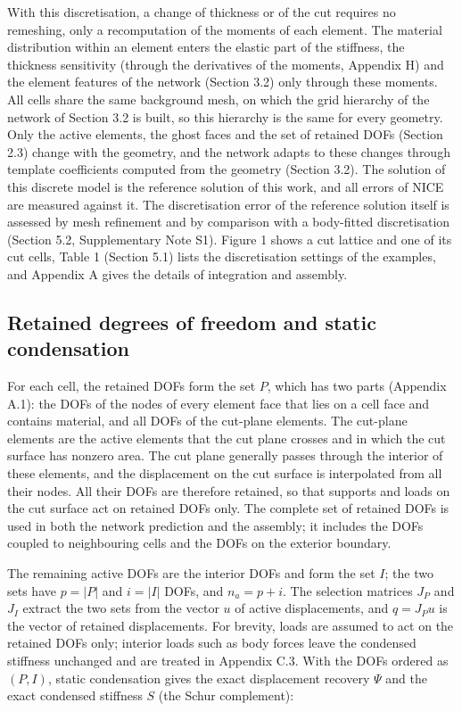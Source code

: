 \documentclass[preprint,12pt,authoryear]{elsarticle}
\begin{document}
With this discretisation, a change of thickness or of the cut requires no remeshing, only a recomputation of the moments of each element. The material distribution within an element enters the elastic part of the stiffness, the thickness sensitivity (through the derivatives of the moments, Appendix H) and the element features of the network (Section 3.2) only through these moments. All cells share the same background mesh, on which the grid hierarchy of the network of Section 3.2 is built, so this hierarchy is the same for every geometry. Only the active elements, the ghost faces and the set of retained DOFs (Section 2.3) change with the geometry, and the network adapts to these changes through template coefficients computed from the geometry (Section 3.2). The solution of this discrete model is the reference solution of this work, and all errors of NICE are measured against it. The discretisation error of the reference solution itself is assessed by mesh refinement and by comparison with a body-fitted discretisation (Section 5.2, Supplementary Note S1). Figure 1 shows a cut lattice and one of its cut cells, Table 1 (Section 5.1) lists the discretisation settings of the examples, and Appendix A gives the details of integration and assembly.

\subsection{Retained degrees of freedom and static condensation}

For each cell, the retained DOFs form the set \(P\), which has two parts (Appendix A.1): the DOFs of the nodes of every element face that lies on a cell face and contains material, and all DOFs of the cut-plane elements. The cut-plane elements are the active elements that the cut plane crosses and in which the cut surface has nonzero area. The cut plane generally passes through the interior of these elements, and the displacement on the cut surface is interpolated from all their nodes. All their DOFs are therefore retained, so that supports and loads on the cut surface act on retained DOFs only. The complete set of retained DOFs is used in both the network prediction and the assembly; it includes the DOFs coupled to neighbouring cells and the DOFs on the exterior boundary.

The remaining active DOFs are the interior DOFs and form the set \(I\); the two sets have \(p=|P|\) and \(i=|I|\) DOFs, and \(n_a=p+i\). The selection matrices \(J_P\) and \(J_I\) extract the two sets from the vector \(u\) of active displacements, and \(q=J_Pu\) is the vector of retained displacements. For brevity, loads are assumed to act on the retained DOFs only; interior loads such as body forces leave the condensed stiffness unchanged and are treated in Appendix C.3. With the DOFs ordered as \((P,I)\), static condensation gives the exact displacement recovery \(\Psi\) and the exact condensed stiffness \(S\) (the Schur complement):
\end{document}
